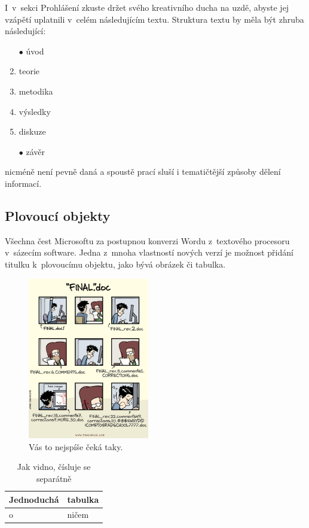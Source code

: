 \documentclass{template/socthesis}
\begin{document}
I~v~sekci Prohlášení zkuste držet svého kreativního ducha na uzdě, abyste jej vzápětí uplatnili v~celém následujícím textu. Struktura textu by měla být zhruba následující:

\begin{enumerate}
\item[$\bullet$] úvod
\item teorie
\item metodika
\item výsledky
\item diskuze
\item[$\bullet$] závěr
\end{enumerate}
nicméně není pevně daná a spoustě prací sluší i tematičtější způsoby dělení informací.

\subsection{Plovoucí objekty}
Všechna čest Microsoftu za postupnou konverzi Wordu z~textového procesoru v~sázecím software. Jedna z~mnoha vlastností nových verzí je možnost přidání titulku k~plovoucímu objektu, jako bývá obrázek či tabulka.

\begin{figure}[h]
  	\centering
 	\includegraphics[width=200px]{img/final_doc.png}
 	\caption{Vás to nejspíše čeká taky.}
\end{figure}

\begin{table}[h]
  \centering
    \begin{tabular}{|l|l|}
    \hline
    Jednoduchá & tabulka \\ \hline
    o~& ničem \\
    \hline
    \end{tabular}
  \caption{Jak vidno, čísluje se separátně}
\end{table}
\end{document}
